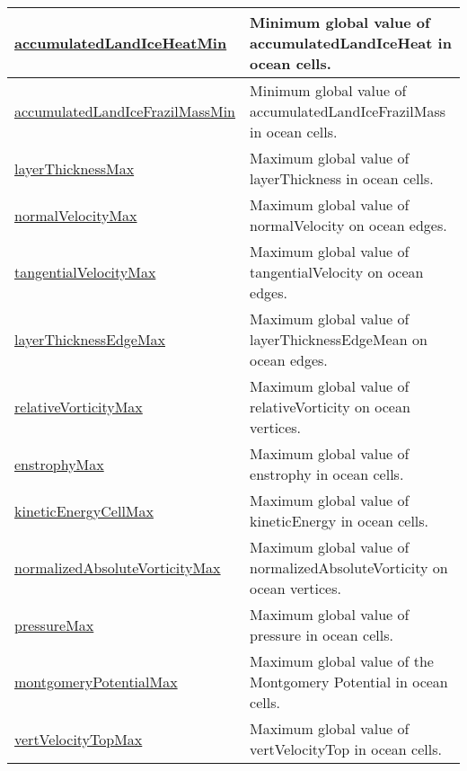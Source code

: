 {\begin{center}
\begin{longtable}{| p{2.0in} | p{4.0in} |}
    \hline
    \hyperref[subsec:var_sec_globalStatsAM_accumulatedLandIceHeatMin]{accumulatedLandIceHeatMin} & Minimum global value of accumulatedLandIceHeat in ocean cells. \\
    \hline
    \hyperref[subsec:var_sec_globalStatsAM_accumulatedLandIceFrazilMassMin]{accumulatedLandIceFrazilMass\-Min} & Minimum global value of accumulatedLandIceFrazilMass in ocean cells. \\
    \hline
    \hyperref[subsec:var_sec_globalStatsAM_layerThicknessMax]{layerThicknessMax} & Maximum global value of layerThickness in ocean cells. \\
    \hline
    \hyperref[subsec:var_sec_globalStatsAM_normalVelocityMax]{normalVelocityMax} & Maximum global value of normalVelocity on ocean edges. \\
    \hline
    \hyperref[subsec:var_sec_globalStatsAM_tangentialVelocityMax]{tangentialVelocityMax} & Maximum global value of tangentialVelocity on ocean edges. \\
    \hline
    \hyperref[subsec:var_sec_globalStatsAM_layerThicknessEdgeMax]{layerThicknessEdgeMax} & Maximum global value of layerThicknessEdgeMean on ocean edges. \\
    \hline
    \hyperref[subsec:var_sec_globalStatsAM_relativeVorticityMax]{relativeVorticityMax} & Maximum global value of relativeVorticity on ocean vertices. \\
    \hline
    \hyperref[subsec:var_sec_globalStatsAM_enstrophyMax]{enstrophyMax} & Maximum global value of enstrophy in ocean cells. \\
    \hline
    \hyperref[subsec:var_sec_globalStatsAM_kineticEnergyCellMax]{kineticEnergyCellMax} & Maximum global value of kineticEnergy in ocean cells. \\
    \hline
    \hyperref[subsec:var_sec_globalStatsAM_normalizedAbsoluteVorticityMax]{normalizedAbsoluteVorticityMax} & Maximum global value of normalizedAbsoluteVorticity on ocean vertices. \\
    \hline
    \hyperref[subsec:var_sec_globalStatsAM_pressureMax]{pressureMax} & Maximum global value of pressure in ocean cells. \\
    \hline
    \hyperref[subsec:var_sec_globalStatsAM_montgomeryPotentialMax]{montgomeryPotentialMax} & Maximum global value of the Montgomery Potential in ocean cells. \\
    \hline
    \hyperref[subsec:var_sec_globalStatsAM_vertVelocityTopMax]{vertVelocityTopMax} & Maximum global value of vertVelocityTop in ocean cells. \\

\end{longtable}
\end{center}}
